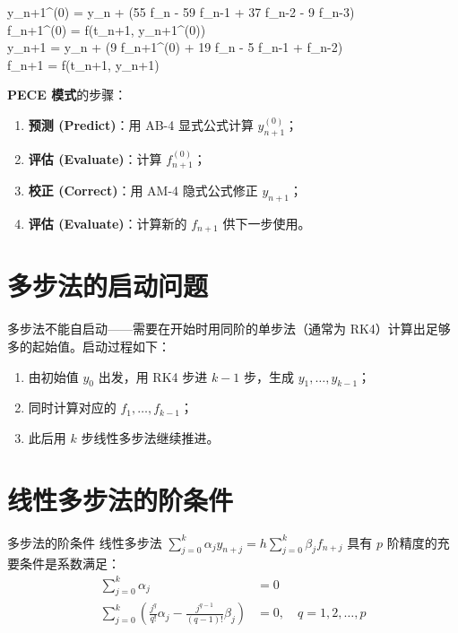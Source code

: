 \begin{myformula}
	\begin{cases}
		 \quad y_{n+1}^{(0)} = y_n +  (55 f_n - 59 f_{n-1} + 37 f_{n-2} - 9 f_{n-3}) \\[8pt]
		 \quad f_{n+1}^{(0)} = f(t_{n+1}, y_{n+1}^{(0)}) \\[8pt]
		 \quad y_{n+1} = y_n +  (9 f_{n+1}^{(0)} + 19 f_n - 5 f_{n-1} + f_{n-2}) \\[8pt]
		 \quad f_{n+1} = f(t_{n+1}, y_{n+1})
	\end{cases}
\end{myformula}

\textbf{PECE 模式}的步骤：
\begin{enumerate}
	\item \textbf{预测 (Predict)}：用 AB-4 显式公式计算 $y_{n+1}^{(0)}$；
	\item \textbf{评估 (Evaluate)}：计算 $f_{n+1}^{(0)}$；
	\item \textbf{校正 (Correct)}：用 AM-4 隐式公式修正 $y_{n+1}$；
	\item \textbf{评估 (Evaluate)}：计算新的 $f_{n+1}$ 供下一步使用。
\end{enumerate}

\section{多步法的启动问题}

多步法不能自启动——需要在开始时用同阶的单步法（通常为 RK4）计算出足够多的起始值。启动过程如下：

\begin{enumerate}
	\item 由初始值 $y_0$ 出发，用 RK4 步进 $k-1$ 步，生成 $y_1, \ldots, y_{k-1}$；
	\item 同时计算对应的 $f_1, \ldots, f_{k-1}$；
	\item 此后用 $k$ 步线性多步法继续推进。
\end{enumerate}

\section{线性多步法的阶条件}

\begin{theorem}{多步法的阶条件}
	线性多步法 $\sum_{j=0}^{k} \alpha_j y_{n+j} = h \sum_{j=0}^{k} \beta_j f_{n+j}$ 具有 $p$ 阶精度的充要条件是系数满足：
	\[
	\begin{aligned}
		\sum_{j=0}^{k} \alpha_j &= 0 \\
		\sum_{j=0}^{k} \left( \frac{j^q}{q!} \alpha_j - \frac{j^{q-1}}{(q-1)!} \beta_j \right) &= 0, \quad q = 1, 2, \ldots, p
	\end{aligned}
	\]
\end{theorem}

